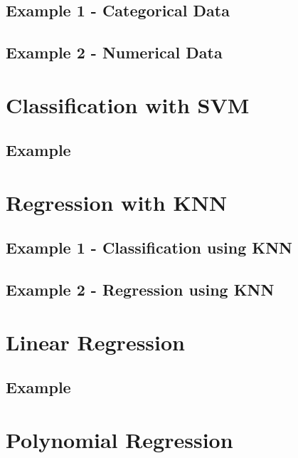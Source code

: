 \documentclass[10pt,twoside,a4paper,openany]{memoir}
\begin{document}
\section{Example 1 - Categorical Data}


\section{Example 2 - Numerical Data}



\chapter{Classification with SVM}

\section{Example}



\chapter{Regression with KNN}

\section{Example 1 - Classification using KNN}


\newpage
\section{Example 2 - Regression using KNN}



\chapter{Linear Regression}

\section{Example}



\chapter{Polynomial Regression}
\end{document}
